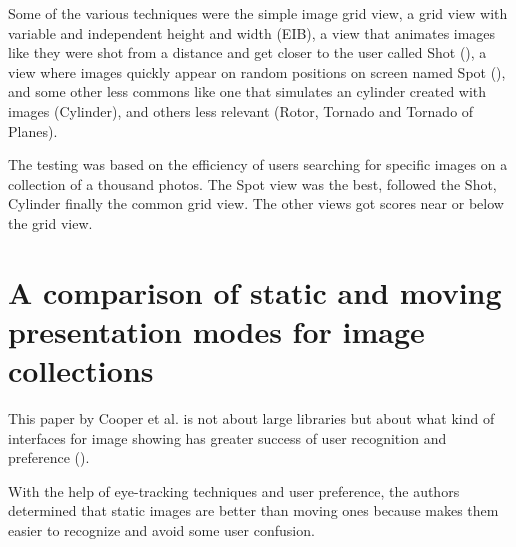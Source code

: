 Some of the various techniques were the simple image grid view, a grid view with variable and independent height and width (EIB), a view that animates images like they were shot from a distance and get closer to the user called Shot (), a view where images quickly appear on random positions on screen named Spot (), and some other less commons like one that simulates an cylinder created with images (Cylinder), and others less relevant (Rotor, Tornado and Tornado of Planes).

The testing was based on the efficiency of users searching for specific images on a collection of a thousand photos. The Spot view was the best, followed the Shot, Cylinder finally the common grid view. The other views got scores near or below the grid view.


\section{A comparison of static and moving presentation modes for image collections} %
\label{sub:Cooper}

This paper by Cooper et al. \cite{Cooper:2006p543} is not about large libraries but about what kind of interfaces for image showing has greater success of user recognition and preference ().

With the help of eye-tracking techniques and user preference, the authors determined that static images are better than moving ones because makes them easier to recognize and avoid some user confusion.

